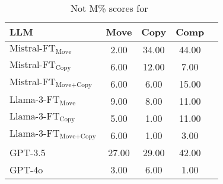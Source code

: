 \begin{table}[tb]
\small
\centering
\setlength{\tabcolsep}{2mm}
\begin{tabular}{lcc|cc}
\toprule
\textbf{LLM} &\textbf{Move} & \textbf{Copy} & \textbf{Comp} %
\\
\midrule
$\text{Mistral-FT}_{\text{Move}}$ &2.00&34.00&44.00  \\
$\text{Mistral-FT}_{\text{Copy}}$ &6.00&12.00&7.00\\
$\text{Mistral-FT}_{\text{Move+Copy}}$ &6.00&6.00&15.00\\
\midrule
$\text{Llama-3-FT}_{\text{Move}}$ &9.00&8.00&11.00\\
$\text{Llama-3-FT}_{\text{Copy}}$ &5.00&1.00&11.00\\
$\text{Llama-3-FT}_{\text{Move+Copy}}$ &6.00&1.00&3.00\\
\midrule
GPT-3.5 &27.00&29.00&42.00\\
GPT-4o &3.00&6.00&1.00\\
\bottomrule
\end{tabular}
\caption{Not M\% scores for~}

\label{tab:composition_plus}
\end{table}

